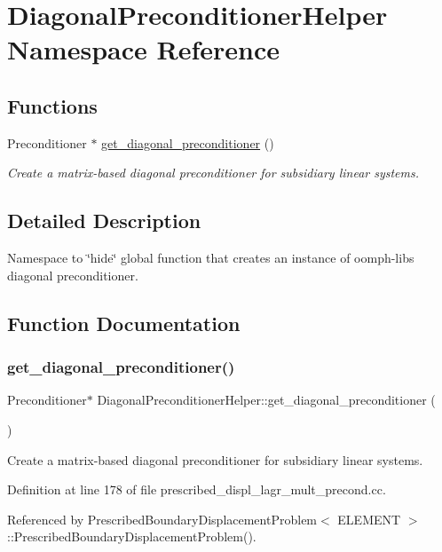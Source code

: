 \hypertarget{namespaceDiagonalPreconditionerHelper}{}\section{Diagonal\+Preconditioner\+Helper Namespace Reference}
\label{namespaceDiagonalPreconditionerHelper}
\subsection*{Functions}
\begin{DoxyCompactItemize}
\item 
Preconditioner $\ast$ \hyperlink{namespaceDiagonalPreconditionerHelper_a455a8314b4dc41c20c9859b8509cc740}{get\+\_\+diagonal\+\_\+preconditioner} ()
\begin{DoxyCompactList}\small\item\em Create a matrix-\/based diagonal preconditioner for subsidiary linear systems. \end{DoxyCompactList}\end{DoxyCompactItemize}


\subsection{Detailed Description}
Namespace to \char`\"{}hide\char`\"{} global function that creates an instance of oomph-\/lib\textquotesingle{}s diagonal preconditioner. 

\subsection{Function Documentation}
\mbox{\label{namespaceDiagonalPreconditionerHelper_a455a8314b4dc41c20c9859b8509cc740}} 
\subsubsection{\texorpdfstring{get\+\_\+diagonal\+\_\+preconditioner()}{get\_diagonal\_preconditioner()}}
{\footnotesize\ttfamily Preconditioner$\ast$ Diagonal\+Preconditioner\+Helper\+::get\+\_\+diagonal\+\_\+preconditioner (\begin{DoxyParamCaption}{ }\end{DoxyParamCaption})}



Create a matrix-\/based diagonal preconditioner for subsidiary linear systems. 



Definition at line 178 of file prescribed\+\_\+displ\+\_\+lagr\+\_\+mult\+\_\+precond.\+cc.



Referenced by Prescribed\+Boundary\+Displacement\+Problem$<$ E\+L\+E\+M\+E\+N\+T $>$\+::\+Prescribed\+Boundary\+Displacement\+Problem().

